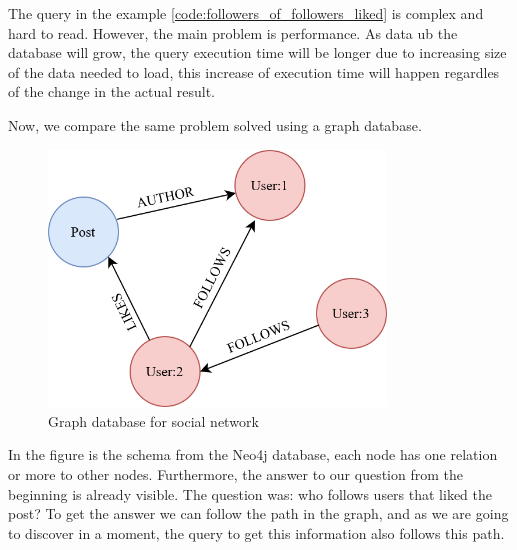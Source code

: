 
The query in the example \ref{code:followers_of_followers_liked} is complex and hard to read. However, the main problem is performance.
As data ub the database will grow, the query execution time will be longer due to increasing size of the data needed to load, this increase of execution time will happen regardles of the change in the actual result.

Now, we compare the same problem solved using a graph database.

\begin{figure}[H]
    \centering
    \includegraphics[width=0.8\textwidth]{content/graph_example.png}
    \caption{Graph database for social network}
    \label{fig:graphscheme}
\end{figure}

In the figure \label{fig:graphscheme} is the schema from the Neo4j database, each node has one relation or more to other nodes.
Furthermore, the answer to our question from the beginning is already visible. The question was: who follows users that liked the post?
To get the answer we can follow the path in the graph, and as we are going to discover in a moment, the query to get this information also follows this path.

